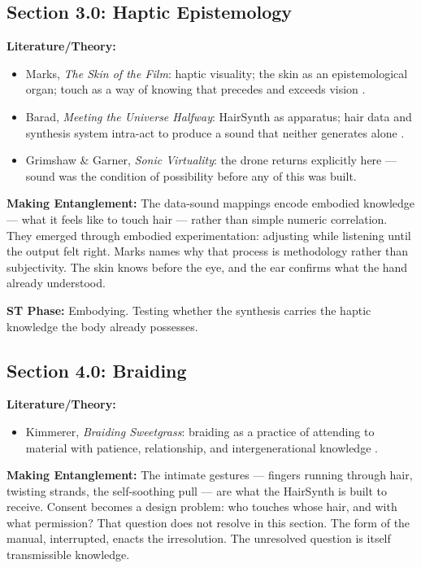 \medskip

\subsection*{Section 3.0: Haptic Epistemology}

\noindent\textbf{Literature/Theory:}
\begin{itemize}[noitemsep]
    \item Marks, \textit{The Skin of the Film}: haptic visuality; the skin as an epistemological organ; touch as a way of knowing that precedes and exceeds vision \parencite{Marks_2000}.
    \item Barad, \textit{Meeting the Universe Halfway}: HairSynth as apparatus; hair data and synthesis system intra-act to produce a sound that neither generates alone \parencite{Barad_2007}.
    \item Grimshaw \& Garner, \textit{Sonic Virtuality}: the drone returns explicitly here — sound was the condition of possibility before any of this was built.
\end{itemize}

\noindent\textbf{Making Entanglement:} The data-sound mappings encode embodied knowledge — what it feels like to touch hair — rather than simple numeric correlation. They emerged through embodied experimentation: adjusting while listening until the output felt right. Marks names why that process is methodology rather than subjectivity. The skin knows before the eye, and the ear confirms what the hand already understood.

\noindent\textbf{ST Phase:} Embodying. Testing whether the synthesis carries the haptic knowledge the body already possesses.

\medskip

\subsection*{Section 4.0: Braiding}

\noindent\textbf{Literature/Theory:}
\begin{itemize}[noitemsep]
    \item Kimmerer, \textit{Braiding Sweetgrass}: braiding as a practice of attending to material with patience, relationship, and intergenerational knowledge \parencite{Kimmerer_2013}. 
\end{itemize}

\noindent\textbf{Making Entanglement:} The intimate gestures — fingers running through hair, twisting strands, the self-soothing pull — are what the HairSynth is built to receive. Consent becomes a design problem: who touches whose hair, and with what permission? That question does not resolve in this section. The form of the manual, interrupted, enacts the irresolution. The unresolved question is itself transmissible knowledge.

